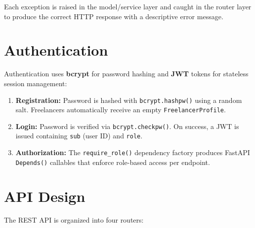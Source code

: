 \documentclass[12pt, a4paper]{report}
\begin{document}
Each exception is raised in the model/service layer and caught in the router layer to produce the correct HTTP response with a descriptive error message.

\section{Authentication}

Authentication uses \textbf{bcrypt} for password hashing and \textbf{JWT} tokens for stateless session management:

\begin{enumerate}
  \item \textbf{Registration:} Password is hashed with \texttt{bcrypt.hashpw()} using a random salt. Freelancers automatically receive an empty \texttt{FreelancerProfile}.
  \item \textbf{Login:} Password is verified via \texttt{bcrypt.checkpw()}. On success, a JWT is issued containing \texttt{sub} (user ID) and \texttt{role}.
  \item \textbf{Authorization:} The \texttt{require\_role()} dependency factory produces FastAPI \texttt{Depends()} callables that enforce role-based access per endpoint.
\end{enumerate}

\section{API Design}

The REST API is organized into four routers:
\end{document}
